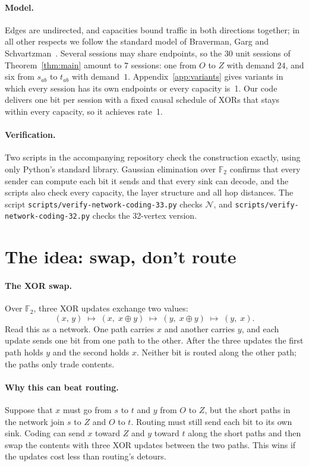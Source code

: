 \documentclass[11pt]{article}
\newcommand{\F}{\mathbb{F}_2}
\begin{document}
\paragraph{Model.} Edges are undirected, and capacities bound traffic in both directions together; in all other respects we follow the standard model of Braverman, Garg and Schvartzman~\cite[\S2 and Appendix~A]{BGS17}. Several sessions may share endpoints, so the $30$ unit sessions of Theorem~\ref{thm:main} amount to $7$ sessions: one from $O$ to $Z$ with demand $24$, and six from $s_{ab}$ to $t_{ab}$ with demand~$1$. Appendix~\ref{app:variants} gives variants in which every session has its own endpoints or every capacity is~1. Our code delivers one bit per session with a fixed causal schedule of XORs that stays within every capacity, so it achieves rate~1.

\paragraph{Verification.} Two scripts in the accompanying repository check the construction exactly, using only Python's standard library. Gaussian elimination over $\F$ confirms that every sender can compute each bit it sends and that every sink can decode, and the scripts also check every capacity, the layer structure and all hop distances. The script \texttt{scripts/verify-network-coding-33.py} checks $\mathcal N$, and \texttt{scripts/verify-network-coding-32.py} checks the 32-vertex version.

\section{The idea: swap, don't route}\label{sec:idea}

\paragraph{The XOR swap.} Over $\F$, three XOR updates exchange two values:
\[
(x,\,y)\;\longmapsto\;(x,\;x\oplus y)\;\longmapsto\;(y,\;x\oplus y)\;\longmapsto\;(y,\;x).
\]
Read this as a network. One path carries $x$ and another carries $y$, and each update sends one bit from one path to the other. After the three updates the first path holds $y$ and the second holds $x$. Neither bit is routed along the other path; the paths only trade contents.

\paragraph{Why this can beat routing.} Suppose that $x$ must go from $s$ to $t$ and $y$ from $O$ to $Z$, but the short paths in the network join $s$ to $Z$ and $O$ to $t$. Routing must still send each bit to its own sink. Coding can send $x$ toward $Z$ and $y$ toward $t$ along the short paths and then swap the contents with three XOR updates between the two paths. This wins if the updates cost less than routing's detours.
\end{document}

